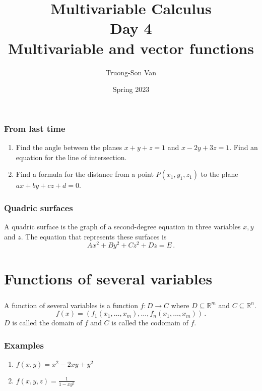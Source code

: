 \documentclass[aspectratio=169]{beamer}
\title{ Multivariable Calculus \\ Day 4 \\ Multivariable and vector functions}
\institute{Fulbright University Vietnam}
\author{Truong-Son Van}
\date{Spring 2023}
\newcommand{\R}{\mathbb{R}}
\begin{document}
\maketitle


\begin{frame}
    \frametitle{From last time}
    \begin{enumerate}
        \item Find the angle between the planes $x+y+z = 1$ and 
            $x -2y + 3z =1$. Find an equation for the line of intersection.
        \item Find a formula for the distance from a point $P(x_1,y_1,z_1)$
            to the plane $ax +by + cz +d = 0 $.
    \end{enumerate}
\end{frame}

\begin{frame}
    \frametitle{Quadric surfaces}
    A quadric surface is the graph of a second-degree equation in three variables
    $x,y$ and $z$. 
    The equation that represents these surfaces is
    $$Ax^2 + By^2 + Cz^2 + Dz = E\,.$$
\end{frame}


\section{Functions of several variables}
\begin{frame}
\begin{definition}
    \frametitle{\secname}
A function of several variables is a function
$f: D \to C$ where $D \subseteq \R^m$ and $C \subseteq \R^n$.
$$f({x}) = ( f_1(x_1,\dots, x_m),\dots, f_n(x_1,\dots, x_m)  ) \,.$$
$D$ is called the domain of $f$ and $C$ is called the codomain of $f$.
\end{definition}
\end{frame}

\begin{frame}
    \frametitle{Examples}

    \begin{enumerate}
        \item $f(x,y) = x^2 - 2xy + y^2$
        \item $f(x,y,z) = \frac{1}{1 - xy^2}$
    \end{enumerate}

\end{frame}
\end{document}
